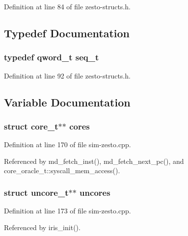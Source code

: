 Definition at line 84 of file zesto-structs.h.

\subsection{Typedef Documentation}
\subsubsection[{seq\_\-t}]{\setlength{\rightskip}{0pt plus 5cm}typedef qword\_\-t {\bf seq\_\-t}}\label{zesto-structs_8h_12ad2f48066289fd2855fccc710cc150}




Definition at line 92 of file zesto-structs.h.

\subsection{Variable Documentation}
\subsubsection[{cores}]{\setlength{\rightskip}{0pt plus 5cm}struct {\bf core\_\-t}$\ast$$\ast$ {\bf cores}}\label{zesto-structs_8h_fd1fbe748ceabf38ef289bb5b346f69a}




Definition at line 170 of file sim-zesto.cpp.

Referenced by md\_\-fetch\_\-inst(), md\_\-fetch\_\-next\_\-pc(), and core\_\-oracle\_\-t::syscall\_\-mem\_\-access().
\subsubsection[{uncores}]{\setlength{\rightskip}{0pt plus 5cm}struct {\bf uncore\_\-t}$\ast$$\ast$ {\bf uncores}}\label{zesto-structs_8h_58a16285046a9c04416e306f52015b52}




Definition at line 173 of file sim-zesto.cpp.

Referenced by iris\_\-init().